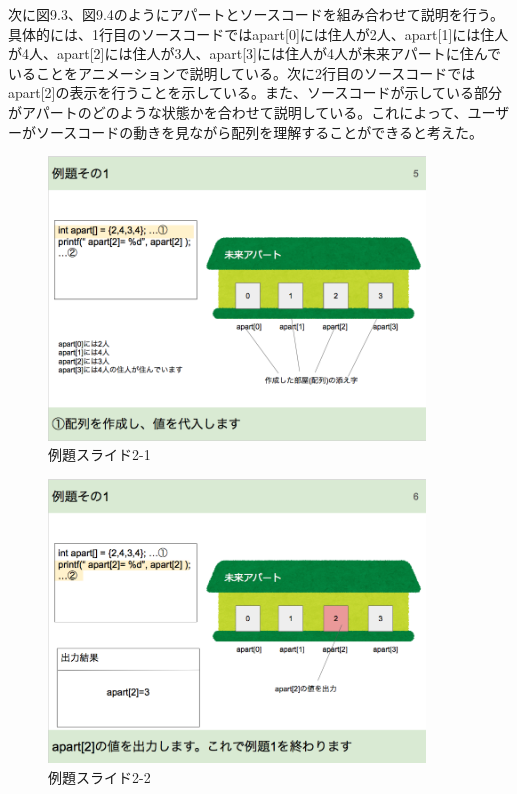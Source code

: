 \documentclass[openany,11pt,papersize]{jsbook}
\begin{document}
次に図9.3、図9.4のようにアパートとソースコードを組み合わせて説明を行う。具体的には、1行目のソースコードではapart[0]には住人が2人、apart[1]には住人が4人、apart[2]には住人が3人、apart[3]には住人が4人が未来アパートに住んでいることをアニメーションで説明している。次に2行目のソースコードではapart[2]の表示を行うことを示している。また、ソースコードが示している部分がアパートのどのような状態かを合わせて説明している。これによって、ユーザーがソースコードの動きを見ながら配列を理解することができると考えた。

\begin{figure}[H]
\begin{center}
\includegraphics[width=10cm, bb=0 0 850 640]{img/9thParagraph/reidai_02.png}
\end{center}
\caption{例題スライド2-1}
\end{figure}

\begin{figure}[H]
\begin{center}
\includegraphics[width=10cm, bb=0 0 850 639]{img/9thParagraph/reidai_03.png}
\end{center}
\caption{例題スライド2-2}
\end{figure}
\end{document}
